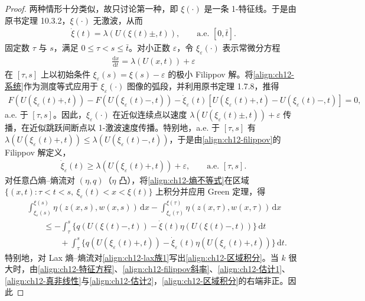 \documentclass[../../main.tex]{subfiles}
\begin{document}
\begin{proof}
两种情形十分类似，故只讨论第一种，即 $\xi(\cdot)$ 是一条 1-特征线。于是由原书定理 10.3.2，$\xi(\cdot)$ 无激波，从而
\begin{align}
\dot\xi(t)=\lambda(U(\xi(t)\pm,t)),\qquad\text{a.e. }[0,\bar t].
\label{align:ch12-特征方程}
\end{align}
固定数 $\tau$ 与 $s$，满足 $0\leqslant\tau<s\leqslant\bar t$。对小正数 $\varepsilon$，令 $\xi_\varepsilon(\cdot)$ 表示常微分方程
\begin{align}
\frac{\mathrm{d}x}{\mathrm{d}t}=\lambda(U(x,t))+\varepsilon
\label{align:ch12-filippov}
\end{align}
在 $[\tau,s]$ 上以初始条件 $\xi_\varepsilon(s)=\xi(s)-\varepsilon$ 的极小 Filippov 解。将\eqref{align:ch12-系统}作为测度等式应用于 $\xi_\varepsilon(\cdot)$ 图像的弧段，并利用原书定理 1.7.8，推得
\begin{align}
F(U(\xi_\varepsilon(t)+,t))-F(U(\xi_\varepsilon(t)-,t))-\dot\xi_\varepsilon(t)[U(\xi_\varepsilon(t)+,t)-U(\xi_\varepsilon(t)-,t)]=0,
\label{align:ch12-riemann关系}
\end{align}
a.e. 于 $[\tau,s]$。因此，$\xi_\varepsilon(\cdot)$ 在近似连续点以速度 $\lambda(U(\xi_\varepsilon(t)\pm,t))+\varepsilon$ 传播，在近似跳跃间断点以 1-激波速度传播。特别地，a.e. 于 $[\tau,s]$ 有 $\lambda(U(\xi_\varepsilon(t)+,t))\leqslant\lambda(U(\xi_\varepsilon(t)-,t))$，于是由\eqref{align:ch12-filippov}的 Filippov 解定义，
\begin{align}
\dot\xi_\varepsilon(t)\geqslant\lambda(U(\xi_\varepsilon(t)+,t))+\varepsilon,\qquad\text{a.e. }[\tau,s].
\label{align:ch12-filippov斜率}
\end{align}
对任意凸熵--熵流对 $(\eta,q)$（$\eta$ 凸），将\eqref{align:ch12-熵不等式}在区域 $\{(x,t):\tau<t<s,\ \xi_\varepsilon(t)<x<\xi(t)\}$ 上积分并应用 Green 定理，得
\begin{align}
&\int_{\xi_\varepsilon(s)}^{\xi(s)}\eta(z(x,s),w(x,s))\,\mathrm{d}x-\int_{\xi_\varepsilon(\tau)}^{\xi(\tau)}\eta(z(x,\tau),w(x,\tau))\,\mathrm{d}x\nonumber\\
&\qquad\leqslant-\int_\tau^s\{q(U(\xi(t)-,t))-\dot\xi(t)\eta(U(\xi(t)-,t))\}\,\mathrm{d}t\nonumber\\
&\qquad\qquad+\int_\tau^s\{q(U(\xi_\varepsilon(t)+,t))-\dot\xi_\varepsilon(t)\eta(U(\xi_\varepsilon(t)+,t))\}\,\mathrm{d}t.
\label{align:ch12-区域积分}
\end{align}
特别地，对 Lax 熵--熵流对\eqref{align:ch12-lax族1}写出\eqref{align:ch12-区域积分}。当 $k$ 很大时，由\eqref{align:ch12-特征方程}、\eqref{align:ch12-filippov斜率}、\eqref{align:ch12-估计1}、\eqref{align:ch12-真非线性}与\eqref{align:ch12-估计2}，\eqref{align:ch12-区域积分}的右端非正。因此

\end{proof}
\end{document}
